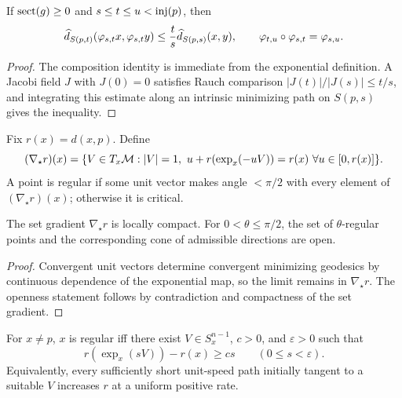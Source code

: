 \begin{proposition}
\label{prop:chow-iii-i29-small-sphere-monotonicity}
If $\operatorname{sect}(g)\ge0$ and $s\le t\le u<\operatorname{inj}(p)$, then
\[
\widehat d_{S(p,t)}(\varphi_{s,t}x,\varphi_{s,t}y)
\le\frac ts\widehat d_{S(p,s)}(x,y),\qquad
\varphi_{t,u}\circ\varphi_{s,t}=\varphi_{s,u}.
\]
\end{proposition}
\begin{proof}
The composition identity is immediate from the exponential definition.  A
Jacobi field $J$ with $J(0)=0$ satisfies Rauch comparison
$|J(t)|/|J(s)|\le t/s$, and integrating this estimate along an intrinsic
minimizing path on $S(p,s)$ gives the inequality.
\end{proof}

\begin{definition}
\label{def:chow-iii-i30-i31-gradient-regularity}
Fix $r(x)=d(x,p)$.  Define
\[
(\nabla_\star r)(x)=\{V\in T_x\M:|V|=1,\ u+r(\exp_x(-uV))=r(x)\ \forall u\in[0,r(x)]\}.
\]
A point is regular if some unit vector makes angle $<\pi/2$ with every element
of $(\nabla_\star r)(x)$; otherwise it is critical.
\end{definition}

\begin{lemma}
\label{lem:chow-iii-i30-i33-regular-open}
The set gradient $\nabla_\star r$ is locally compact.  For
$0<\theta\le\pi/2$, the set of $\theta$-regular points and the corresponding
cone of admissible directions are open.
\end{lemma}
\begin{proof}
Convergent unit vectors determine convergent minimizing geodesics by continuous
dependence of the exponential map, so the limit remains in $\nabla_\star r$.
The openness statement follows by contradiction and compactness of the set
gradient.
\end{proof}

\begin{lemma}
\label{lem:chow-iii-i34-i35-regular-characterization}
For $x\ne p$, $x$ is regular iff there exist $V\in S_x^{n-1}$, $c>0$, and
$\varepsilon>0$ such that
\[
r(\exp_x(sV))-r(x)\ge cs\qquad(0\le s<\varepsilon).
\]
Equivalently, every sufficiently short unit-speed path initially tangent to a
suitable $V$ increases $r$ at a uniform positive rate.
\end{lemma}

